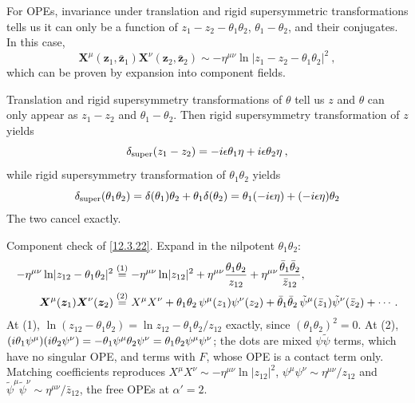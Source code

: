 For OPEs, invariance under translation and rigid supersymmetric transformations tells us it can only be a function of $z_{1}-z_{2}-\theta_{1}\theta_{2}$, $\theta_{1}-\theta_{2}$, and their conjugates. In this case,
\begin{equation}
	\bm{X}^{\mu}(\bm{z}_{1},\bar{\bm{z}}_{1})\bm{X}^{\nu}(\bm{z}_{2},\bar{\bm{z}}_{2})\sim
	-\eta^{\mu\nu}\ln\lvert z_{1}-z_{2}-\theta_{1}\theta_{2}\rvert^{2} \:, \label{12.3.22}
\end{equation}
which can be proven by expansion into component fields.
\begin{tcolorbox}[breakable]
	Translation and rigid supersymmetry transformations of $\theta$ tell us $z$ and $\theta$ can only appear as $z_{1}-z_{2}$ and $\theta_{1}-\theta_{2}$. Then rigid supersymmetry transformation of $z$ yields
	\[
	\delta_{\text{super}}(z_{1}-z_{2}) = -i\epsilon\theta_{1}\eta+i\epsilon\theta_{2}\eta \:,
	\]
	while rigid supersymmetry transformation of $\theta_{1}\theta_{2}$ yields
	\[
	\delta_{\text{super}}(\theta_{1}\theta_{2})= \delta(\theta_{1})\theta_{2}+\theta_{1}\delta(\theta_{2})
	=\theta_{1}(-i\epsilon\eta)+(-i\epsilon\eta)\theta_{2}
	\]
	The two cancel exactly.
\end{tcolorbox}
\begin{tcolorbox}[breakable]
	Component check of \eqref{12.3.22}. Expand in the nilpotent $\theta_{1}\theta_{2}$:
	\begin{align*}
		-\eta^{\mu\nu}\ln\lvert z_{12}-\theta_{1}\theta_{2}\rvert^{2}
		&\overset{(1)}{=} -\eta^{\mu\nu}\ln\lvert z_{12}\rvert^{2}+\eta^{\mu\nu}\frac{\theta_{1}\theta_{2}}{z_{12}}+\eta^{\mu\nu}\frac{\bar\theta_{1}\bar\theta_{2}}{\bar z_{12}} ,\\
		\bm X^{\mu}(\bm z_{1})\bm X^{\nu}(\bm z_{2})
		&\overset{(2)}{=} X^{\mu}X^{\nu}+\theta_{1}\theta_{2}\,\psi^{\mu}(z_{1})\psi^{\nu}(z_{2})+\bar\theta_{1}\bar\theta_{2}\,\tilde\psi^{\mu}(\bar z_{1})\tilde\psi^{\nu}(\bar z_{2})+\cdots .
	\end{align*}
	At (1), $\ln(z_{12}-\theta_{1}\theta_{2})=\ln z_{12}-\theta_{1}\theta_{2}/z_{12}$ exactly, since $(\theta_{1}\theta_{2})^{2}=0$. At (2), $(i\theta_{1}\psi^{\mu})(i\theta_{2}\psi^{\nu})=-\theta_{1}\psi^{\mu}\theta_{2}\psi^{\nu}=\theta_{1}\theta_{2}\psi^{\mu}\psi^{\nu}$; the dots are mixed $\psi\tilde\psi$ terms, which have no singular OPE, and terms with $F$, whose OPE is a contact term only. Matching coefficients reproduces $X^{\mu}X^{\nu}\sim-\eta^{\mu\nu}\ln\lvert z_{12}\rvert^{2}$, $\psi^{\mu}\psi^{\nu}\sim\eta^{\mu\nu}/z_{12}$ and $\tilde\psi^{\mu}\tilde\psi^{\nu}\sim\eta^{\mu\nu}/\bar z_{12}$, the free OPEs at $\alpha'=2$.
\end{tcolorbox}
